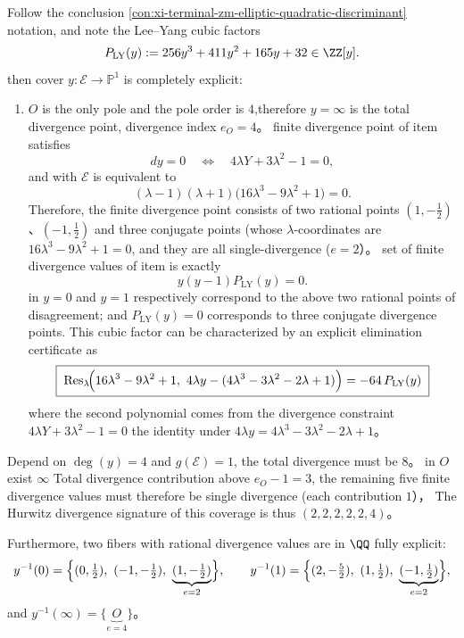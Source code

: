 \begin{conclusion}\label{con:xi-terminal-zm-elliptic-ramification-portrait}
Follow the conclusion \ref{con:xi-terminal-zm-elliptic-quadratic-discriminant} notation, and note the Lee--Yang cubic factors
\[
P_{\mathrm{LY}}(y):=256y^{3}+411y^{2}+165y+32\in\ZZ[y].
\]
then cover \(y:\mathcal{E}\to\mathbb{P}^{1}\) is completely explicit:
\begin{enumerate}
  \item \(O\) is the only pole and the pole order is \(4\),therefore \(y=\infty\) is the total divergence point, divergence index \(e_O=4\)。
  \The finite divergence point of item satisfies
  \[
  dy=0\quad\Longleftrightarrow\quad 4\lambda Y+3\lambda^{2}-1=0,
  \]
  and with \(\mathcal{E}\) is equivalent to
  \[
  (\lambda-1)(\lambda+1)\bigl(16\lambda^{3}-9\lambda^{2}+1\bigr)=0.
  \]
  Therefore, the finite divergence point consists of two rational points \((1,-\tfrac12)\)、\((-1,\tfrac12)\) and three conjugate points (whose \(\lambda\)-coordinates are \(16\lambda^{3}-9\lambda^{2}+1=0\), and they are all single-divergence (\(e=2\)）。
  \The set of finite divergence values ​​of item is exactly
  \[
  y(y-1)P_{\mathrm{LY}}(y)=0.
  \]
  in \(y=0\) and \(y=1\) respectively correspond to the above two rational points of disagreement; and \(P_{\mathrm{LY}}(y)=0\) corresponds to three conjugate divergence points.
  This cubic factor can be characterized by an explicit elimination certificate as
  \[
  \boxed{\;
  \mathrm{Res}_{\lambda}\!\Bigl(16\lambda^{3}-9\lambda^{2}+1,\ 4\lambda y-(4\lambda^{3}-3\lambda^{2}-2\lambda+1)\Bigr)
  =-64\,P_{\mathrm{LY}}(y)\;}
  \]
  where the second polynomial comes from the divergence constraint \(4\lambda Y+3\lambda^{2}-1=0\) the identity under \(4\lambda y=4\lambda^{3}-3\lambda^{2}-2\lambda+1\)。
\end{enumerate}
\par
Depend on \(\deg(y)=4\) and \(g(\mathcal{E})=1\), the total divergence must be \(8\)。
in \(O\) exist \(\infty\) Total divergence contribution above \(e_O-1=3\), the remaining five finite divergence values ​​must therefore be single divergence (each contribution \(1\)），
The Hurwitz divergence signature of this coverage is thus \((2,2,2,2,2,4)\)。
\par
Furthermore, two fibers with rational divergence values ​​are in \(\QQ\) fully explicit:
\[
y^{-1}(0)=\Bigl\{(0,\tfrac12),\ (-1,-\tfrac12),\ \underbrace{(1,-\tfrac12)}_{e=2}\Bigr\},
\qquad
y^{-1}(1)=\Bigl\{(2,-\tfrac52),\ (1,\tfrac12),\ \underbrace{(-1,\tfrac12)}_{e=2}\Bigr\},
\]
and
\(
y^{-1}(\infty)=\{\underbrace{O}_{e=4}\}
\)。
\end{conclusion}

